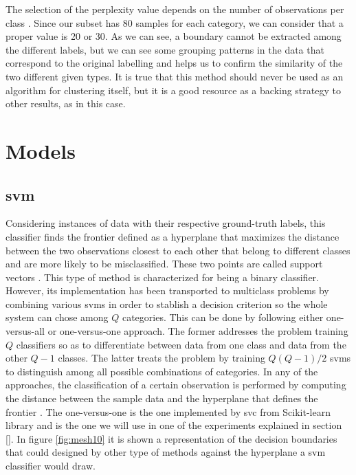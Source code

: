 	
	The selection of the perplexity value depends on the number of observations per class \cite{Wattenberg2016}. Since our subset has 80 samples for each category, we can consider that a proper value is 20 or 30. As we can see, a boundary cannot be extracted among the different labels, but we can see some grouping patterns in the data that correspond to the original labelling and helps us to confirm the similarity of the two different given types. It is true that this method should never be used as an algorithm for clustering itself, but it is a good resource as a backing strategy to other results, as in this case. 
	
\section{Models}
\label{section:models}


\subsection{\acrfull{svm}}
\label{subsection:svm}

	Considering instances of data with their respective ground-truth labels, this classifier finds the frontier defined as a hyperplane that maximizes the distance between the two observations closest to each other that belong to different classes and are more likely to be misclassified. These two points are called support vectors \cite{Fu2011}. This type of method is characterized for being a binary classifier. However, its implementation has been transported to multiclass problems by combining various \acrshort{svm}s in order to stablish a decision criterion so the whole system can chose among $Q$ categories. This can be done by following either one-versus-all or one-versus-one approach. The former addresses the problem training $Q$ classifiers so as to differentiate between data from one class and data from the other $Q-1$ classes. The latter treats the problem by training $Q(Q-1)/2$ \acrshort{svm}s to distinguish among all possible combinations of categories. In any of the approaches, the classification of a certain observation is performed by computing the distance between the sample data and the hyperplane that defines the frontier \cite{Barchiesi2015}. The one-versus-one is the one implemented by \acrfull{svc} from Scikit-learn library and is the one we will use in one of the experiments explained in section \ref{}. In figure \ref{fig:mesh10} it is shown a representation of the decision boundaries that could designed by other type of methods against the hyperplane a \acrshort{svm} classifier would draw.
	
